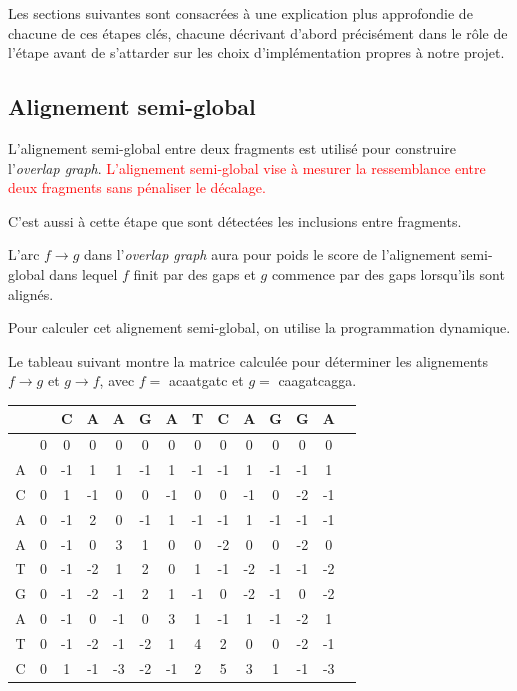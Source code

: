 \documentclass{article}
\begin{document}
Les sections suivantes sont consacrées à une explication plus approfondie de chacune de ces étapes clés, chacune décrivant d'abord précisément dans le rôle de l'étape avant de s'attarder sur les choix d'implémentation propres à notre projet.

\subsection{Alignement semi-global}

L'alignement semi-global entre deux fragments est utilisé pour construire l'\textit{overlap graph}. \textcolor{red}{L'alignement semi-global vise à mesurer la ressemblance entre deux fragments sans pénaliser le décalage.} 

C'est aussi à cette étape que sont détectées les inclusions entre fragments.

L'arc $f \to g$ dans l'\textit{overlap graph} aura pour poids le score de l'alignement semi-global dans lequel $f$ finit par des gaps et $g$ commence par des gaps lorsqu'ils sont alignés.


Pour calculer cet alignement semi-global, on utilise la programmation dynamique.

Le tableau suivant montre la matrice calculée pour déterminer les alignements $f \to g$ et $g \to f$, avec $f =$ acaatgatc et $g =$ caagatcagga.

\begin{table}[h]
	\centering
	\begin{tabular}{|c|c|c|c|c|c|c|c|c|c|c|c|c|c|}
		\hline
		&& C & A & A & G & A & T & C & A & G & G & A\\		
		\hline
		& 0 & 0 & 0 & 0 & 0 & 0 & 0 & 0 & 0 & 0 & \cellcolor{lightgreen}0 & 0  \\
		\hline 
		A&\cellcolor{lightred}0 & -1 & 1 & 1 & -1 & 1 & -1 & -1 & 1 & -1 & -1 &\cellcolor{lightgreen}1 \\
		\hline 
		C&0 & \cellcolor{lightred}1 & -1 & 0 & 0 & -1 & 0 & 0 & -1 & 0 & -2 & -1 \\
		\hline 
		A&0 & -1 & \cellcolor{lightred}2 & 0 & -1 & 1 & -1 & -1 & 1 & -1 & -1 & -1  \\
		\hline 
		A&0 & -1 & 0 & \cellcolor{lightred}3 & 1 & 0 & 0 & -2 & 0 & 0 & -2 & 0 \\
		\hline 
		T&0 & -1 & -2 & \cellcolor{lightred}1 & 2 & 0 & 1 & -1 & -2 & -1 & -1 & -2  \\
		\hline 
		G&0 & -1 & -2 & -1 & \cellcolor{lightred}2 & 1 & -1 & 0 & -2 & -1 & 0 & -2  \\
		\hline 
		A&0 & -1 & 0 & -1 & 0 & \cellcolor{lightred}3 & 1 & -1 & 1 & -1 & -2 & 1  \\
		\hline 
		T&0 & -1 & -2 & -1 & -2 & 1 & \cellcolor{lightred}4 & 2 & 0 & 0 & -2 & -1  \\
		\hline 
		C&0 & 1 & -1 & -3 & -2 & -1 & 2 & \cellcolor{lightred}5 & 3 & 1 & -1 & -3  \\
		\hline 
	\end{tabular}
\end{table}
\end{document}
